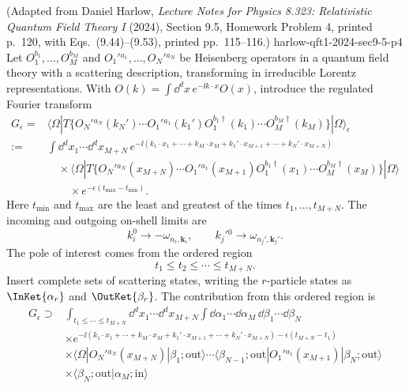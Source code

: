 \begin{enumerate}
  {(Adapted from Daniel Harlow, \emph{Lecture Notes for Physics 8.323:
  Relativistic Quantum Field Theory I} (2024), Section 9.5, Homework
  Problem 4, printed p.~120, with Eqs.~(9.44)--(9.53), printed
  pp.~115--116.)}
  {harlow-qft1-2024-sec9-5-p4}
Let \(O_1^{b_1},\ldots,O_M^{b_M}\) and
\(O_1'{}^{a_1},\ldots,O_N'{}^{a_N}\) be Heisenberg operators in a quantum
field theory with a scattering description, transforming in irreducible
Lorentz representations.  With
\(O(k)=\int \dd^dx\,e^{-\ii k\cdot x}O(x)\), introduce the regulated Fourier
transform
\[
\begin{split}
G_\epsilon={}&
 \langle\Omega|T\{O_N'{}^{a_N}(k_N')\cdots O_1'{}^{a_1}(k_1')
 O_1^{b_1\dagger}(k_1)\cdots O_M^{b_M\dagger}(k_M)\}|\Omega\rangle_\epsilon
\\
:={}&\int \dd^dx_1\cdots \dd^dx_{M+N}\,
 e^{-\ii(k_1\cdot x_1+\cdots+k_M\cdot x_M
       +k_1'\cdot x_{M+1}+\cdots+k_N'\cdot x_{M+N})}
\\[-2pt]
&\quad\times
 \langle\Omega|T\{O_N'{}^{a_N}(x_{M+N})\cdots
 O_1'{}^{a_1}(x_{M+1})O_1^{b_1\dagger}(x_1)\cdots
 O_M^{b_M\dagger}(x_M)\}|\Omega\rangle
\\[-2pt]
&\qquad\times e^{-\epsilon(t_{\max}-t_{\min})}.
\end{split}
\tag{9.44}
\]
Here \(t_{\min}\) and \(t_{\max}\) are the least and greatest of the
times \(t_1,\ldots,t_{M+N}\).  The incoming and outgoing on-shell limits
are
\[
 k_i^0\longrightarrow-\omega_{n_i,\mathbf k_i},
 \qquad
 k_j'{}^0\longrightarrow\omega_{n_j',\mathbf k_j'}.
\tag{9.45}
\]
The pole of interest comes from the ordered region
\[
 t_1\leq t_2\leq\cdots\leq t_{M+N}.
\tag{9.46}
\]
Insert complete sets of scattering states, writing the \(r\)-particle
states as \(\InKet{\alpha_r}\) and
\(\OutKet{\beta_r}\).  The contribution from this ordered
region is
\[
\begin{split}
G_\epsilon\supset{}&
 \int_{t_1\leq\cdots\leq t_{M+N}}
 \dd^dx_1\cdots \dd^dx_{M+N}
 \int \dd\alpha_1\cdots \dd\alpha_M\,\dd\beta_1\cdots \dd\beta_N
\\
&\times e^{-\ii(k_1\cdot x_1+\cdots+k_M\cdot x_M
 +k_1'\cdot x_{M+1}+\cdots+k_N'\cdot x_{M+N})
 -\epsilon(t_{M+N}-t_1)}
\\
&\times\langle\Omega|O_N'{}^{a_N}(x_{M+N})
 |\beta_1;\mathrm{out}\rangle\cdots
 \langle\beta_{N-1};\mathrm{out}|O_1'{}^{a_1}(x_{M+1})
 |\beta_N;\mathrm{out}\rangle
\\
&\times\langle\beta_N;\mathrm{out}|\alpha_M;\mathrm{in}\rangle

\end{split}\]
\end{enumerate}
